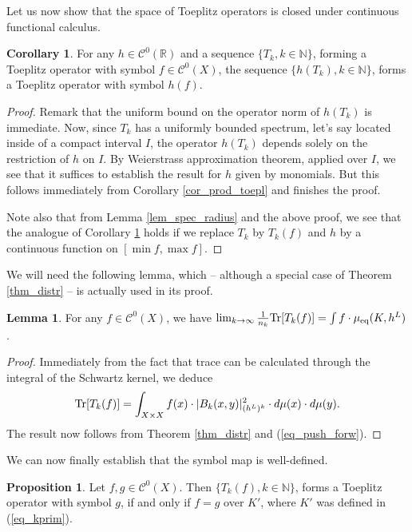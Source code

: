 \documentclass[12pt]{article}
\numberwithin{equation}{section}
\theoremstyle{theorem}
\theoremstyle{definition}
\newtheorem{prop}[thm]{Proposition}
\newtheorem{lem}[thm]{Lemma}
\newtheorem{cor}[thm]{Corollary}
\theoremstyle{remark}
\newcommand{\real}{\mathbb{R}}
\newcommand{\nat}{\mathbb{N}}
\newcommand{\ccal}{\mathscr{C}}
\begin{document}
	Let us now show that the space of Toeplitz operators is closed under continuous functional calculus.
	\begin{cor}\label{cor_func_calc}
		For any $h \in \ccal^0(\real)$ and a sequence $\{ T_k , k \in \nat \}$, forming a Toeplitz operator with symbol $f \in \ccal^0(X)$, the sequence $\{ h(T_k), k \in \nat \}$, forms a Toeplitz operator with symbol $h(f)$.
	\end{cor}
	\begin{proof}
		Remark that the uniform bound on the operator norm of $h(T_k)$ is immediate.
		Now, since $T_k$ has a uniformly bounded spectrum, let's say located inside of a compact interval $I$, the operator $h(T_k)$ depends solely on the restriction of $h$ on $I$.
		By Weierstrass approximation theorem, applied over $I$, we see that it suffices to establish the result for $h$ given by monomials.
		But this follows immediately from Corollary \ref{cor_prod_toepl} and finishes the proof.
		\par 
		Note also that from Lemma \ref{lem_spec_radius} and the above proof, we see that the analogue of Corollary \ref{cor_func_calc} holds if we replace $T_k$ by $T_k(f)$ and $h$ by a continuous function on $[\min f, \max f]$.
	\end{proof}
	We will need the following lemma, which -- although a special case of Theorem \ref{thm_distr} -- is actually used in its proof.
	\begin{lem}\label{lem_trace_toepl}
		For any $f \in \ccal^0(X)$, we have $\lim_{k \to \infty} \frac{1}{n_k} {\rm{Tr}}[T_k(f)] = \int f \cdot \mu_{\mathrm{eq}}(K, h^L)$.
	\end{lem}
	\begin{proof}
		Immediately from the fact that trace can be calculated through the integral of the Schwartz kernel, we deduce
		\begin{equation}
			{\rm{Tr}}[T_k(f)]
			=
			\int_{X \times X} f(x) \cdot |B_k(x, y)|^{2}_{(h^L)^k} \cdot d \mu(x) \cdot d \mu(y).
		\end{equation}
		The result now follows from Theorem \ref{thm_distr} and (\ref{eq_push_forw}).
	\end{proof}
	We can now finally establish that the symbol map is well-defined.
	\begin{prop}\label{prop_symb_well_def}
		Let $f, g \in \ccal^0(X)$.
		Then $\{ T_k(f) , k \in \nat \}$, forms a Toeplitz operator with symbol $g$, if and only if $f = g$ over $K'$, where $K'$ was defined in (\ref{eq_kprim}).
	\end{prop}
\end{document}
